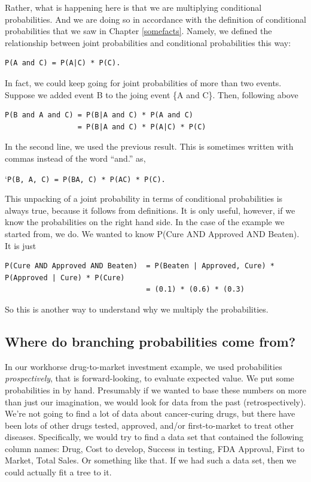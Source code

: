 \documentclass[
  openany]{book}
\begin{document}
Rather, what is happening here is that we are multiplying conditional probabilities. And we are doing so in accordance with the definition of conditional probabilities that we saw in Chapter \ref{somefacts}. Namely, we defined the relationship between joint probabilities and conditional probabilities this way:

\begin{verbatim}
P(A and C) = P(A|C) * P(C).
\end{verbatim}

In fact, we could keep going for joint probabilities of more than two events. Suppose we added event B to the joing event \{A and C\}. Then, following above

\begin{verbatim}
P(B and A and C) = P(B|A and C) * P(A and C)
                 = P(B|A and C) * P(A|C) * P(C)
\end{verbatim}

In the second line, we used the previous result. This is sometimes written with commas instead of the word ``and.'' as,

`\texttt{P(B,\ A,\ C)\ =\ P(B\textbar{}A,\ C)\ *\ P(A\textbar{}C)\ *\ P(C).}

This unpacking of a joint probability in terms of conditional probabilities is always true, because it follows from definitions. It is only useful, however, if we know the probabilities on the right hand side. In the case of the example we started from, we do. We wanted to know P(Cure AND Approved AND Beaten). It is just

\begin{verbatim}
P(Cure AND Approved AND Beaten)  = P(Beaten | Approved, Cure) * P(Approved | Cure) * P(Cure)
                                 = (0.1) * (0.6) * (0.3)
\end{verbatim}

So this is another way to understand why we multiply the probabilities.

\hypertarget{where-do-branching-probabilities-come-from}{%
\subsection*{Where do branching probabilities come from?}\label{where-do-branching-probabilities-come-from}}

In our workhorse drug-to-market investment example, we used probabilities \emph{prospectively}, that is forward-looking, to evaluate expected value. We put some probabilities in by hand. Presumably if we wanted to base these numbers on more than just our imagination, we would look for data from the past (retrospectively). We're not going to find a lot of data about cancer-curing drugs, but there have been lots of other drugs tested, approved, and/or first-to-market to treat other diseases. Specifically, we would try to find a data set that contained the following column names: Drug, Cost to develop, Success in testing, FDA Approval, First to Market, Total Sales. Or something like that. If we had such a data set, then we could actually fit a tree to it.
\end{document}
